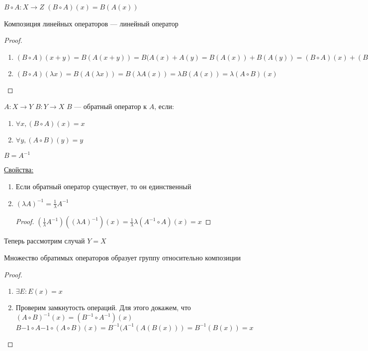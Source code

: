 \begin{Def}
\begin{Def}
$B \circ A \colon X \rightarrow Z$
$(B \circ A)(x) = B(A(x))$
\end{Def}
\begin{theorem}
Композиция линейных операторов --- линейный оператор\\
\end{theorem}
\begin{proof}
\begin{enumerate}
\item $(B \circ A)(x + y)  = B(A(x + y)) = B(A(x) + A(y) = B(A(x)) + B(A(y))  = (B \circ A)(x) + (B \circ A)(y)$
\item $(B \circ A)(\lambda x) = B(A(\lambda x)) = B(\lambda A(x)) = \lambda B(A(x)) = \lambda (A \circ B) (x)$
\end{enumerate}
\end{proof}
\begin{Def}
$A \colon X \rightarrow Y$
$B \colon Y \rightarrow X$
$B$ --- обратный оператор к $A$, если:
\begin{enumerate}
\item $\forall x, (B \circ A)(x) = x$
\item $\forall y, (A \circ B)(y) = y$
\end{enumerate}
$B = A^{-1}$
\end{Def}
\underline{Свойства:}
\begin{enumerate}
\item Если обратный оператор существует, то он единственный
\item $(\lambda A) ^ {-1} = \frac{1}{\lambda}A^{-1}$
\begin{proof}
$(\frac{1}{\lambda}A^{-1})((\lambda A) ^ {-1} )(x) = \frac{1}{\lambda} \lambda(A^{-1} \circ A)(x) = x$
\end{proof}
\end{enumerate}
Теперь рассмотрим случай $Y = X$\\
\begin{theorem}
Множество обратимых операторов образует группу относительно композиции
\end{theorem}
\begin{proof}
\begin{enumerate}
\item $\exists E \colon E(x) = x$
\item Проверим замкнутость операций. Для этого докажем, что\\
$(A \circ B) ^ {-1} (x) = (B^{-1} \circ A^{-1}) (x)$\\ 
$B{-1} \circ A{-1} \circ (A \circ B) (x) = B ^ {-1}(A^{-1}(A(B(x))) = B^{-1}(B(x)) = x$

\end{enumerate}
\end{proof}
\end{Def}
